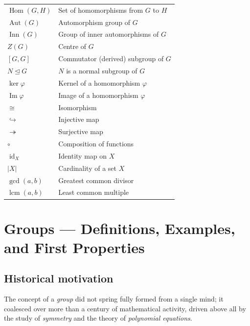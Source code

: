 \documentclass[12pt,a4paper,openany]{book}
\theoremstyle{definition}
\theoremstyle{remark}
\DeclareMathOperator{\Aut}{Aut}
\DeclareMathOperator{\Inn}{Inn}
\DeclareMathOperator{\Hom}{Hom}
\DeclareMathOperator{\im}{Im}
\DeclareMathOperator{\id}{id}
\DeclareMathOperator{\lcm}{lcm}
\renewcommand{\gcd}{\operatorname{gcd}}
\begin{document}
\begin{tabular}{@{}ll@{}}
  $\Hom(G,H)$  & Set of homomorphisms from $G$ to $H$\\
  $\Aut(G)$    & Automorphism group of $G$\\
  $\Inn(G)$    & Group of inner automorphisms of $G$\\
  $Z(G)$       & Centre of $G$\\
  $[G,G]$      & Commutator (derived) subgroup of $G$\\
  $N\trianglelefteq G$ & $N$ is a normal subgroup of $G$\\
  $\ker\varphi$ & Kernel of a homomorphism $\varphi$\\
  $\im\varphi$  & Image of a homomorphism $\varphi$\\
  $\cong$       & Isomorphism\\
  $\hookrightarrow$ & Injective map\\
  $\twoheadrightarrow$ & Surjective map\\
  $\circ$       & Composition of functions\\
  $\id_X$       & Identity map on $X$\\
  $|X|$         & Cardinality of a set $X$\\
  $\gcd(a,b)$   & Greatest common divisor\\
  $\lcm(a,b)$   & Least common multiple\\
  \bottomrule
\end{tabular}

\mainmatter

\chapter{Groups --- Definitions, Examples, and First Properties}
\label{chap:groups-intro}

\section{Historical motivation}
\label{sec:ch1-history}

The concept of a \emph{group} did not spring fully formed from
a single mind; it coalesced over more than a century of mathematical
activity, driven above all by the study of \emph{symmetry}
and the theory of \emph{polynomial equations}.
\end{document}
